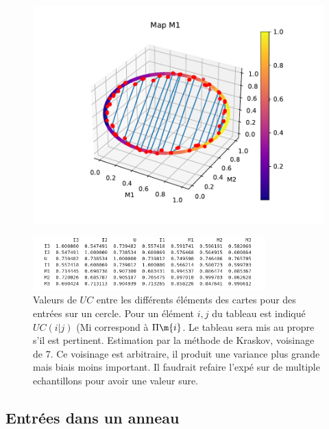 \begin{figure}[h!]
\begin{minipage}{0.33\textwidth}
\end{minipage}
\begin{minipage}{0.33\textwidth}
\includegraphics[width=\textwidth]{3som_cercle_din1}
\end{minipage}
\end{figure}
\begin{figure}
\centering\includegraphics[width=0.8\textwidth]{3som_cercle_im}
\caption{Valeurs de $UC$ entre les différents éléments des cartes pour des entrées sur un cercle. Pour un élément $i,j$ du tableau est indiqué $UC(i|j)$ (Mi correspond à $\Pi\m{i}$. Le tableau sera mis au propre s'il est pertinent. Estimation par la méthode de Kraskov, voisinage de 7. Ce voisinage est arbitraire, il produit une variance plus grande mais biais moins important. Il faudrait refaire l'expé sur de multiple echantillons pour avoir une valeur sure. }
\label{fig:3som_cercle}
\end{figure}



\subsection{Entrées dans un anneau}

